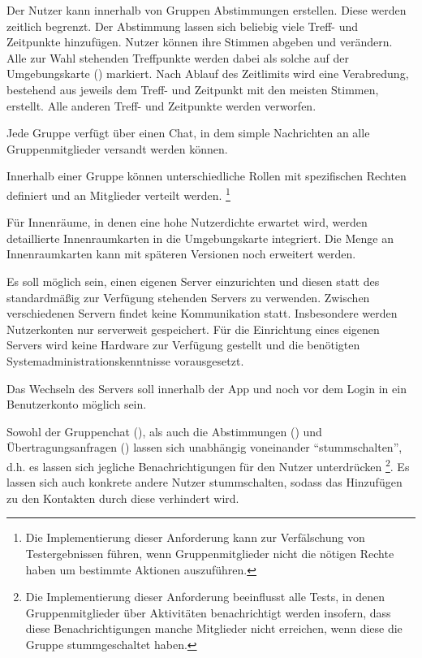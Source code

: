 \documentclass[parskip=full,11pt]{scrartcl}
\begin{document}
%
Der Nutzer kann innerhalb von Gruppen Abstimmungen erstellen.
Diese werden zeitlich begrenzt.
Der Abstimmung lassen sich beliebig viele Treff- und Zeitpunkte hinzufügen.
Nutzer können ihre Stimmen abgeben und verändern.
Alle zur Wahl stehenden Treffpunkte werden dabei als solche auf der
Umgebungskarte () markiert.
Nach Ablauf des Zeitlimits wird eine Verabredung, bestehend aus jeweils dem
Treff- und Zeitpunkt mit den meisten Stimmen, erstellt.
Alle anderen Treff- und Zeitpunkte werden verworfen.

%
Jede Gruppe verfügt über einen Chat, in dem simple Nachrichten an alle
Gruppenmitglieder versandt werden können.

Innerhalb einer Gruppe können unterschiedliche Rollen
mit spezifischen Rechten definiert und an Mitglieder verteilt werden.
\footnote{Die Implementierung dieser Anforderung kann zur Verfälschung von
Testergebnissen führen, wenn Gruppenmitglieder nicht die nötigen Rechte haben
um bestimmte Aktionen auszuführen.}

%
Für Innenräume, in denen eine hohe Nutzerdichte erwartet wird, werden
detaillierte Innenraumkarten in die Umgebungskarte integriert. Die Menge an
Innenraumkarten kann mit späteren Versionen noch erweitert werden.

%
Es soll möglich sein, einen eigenen Server einzurichten und diesen statt des
standardmäßig zur Verfügung stehenden Servers zu verwenden.
Zwischen verschiedenen Servern findet keine Kommunikation statt.
Insbesondere werden Nutzerkonten nur serverweit gespeichert.
Für die Einrichtung eines eigenen Servers wird keine Hardware zur Verfügung
gestellt und die benötigten Systemadministrationskenntnisse vorausgesetzt.

%
Das Wechseln des Servers soll innerhalb der App und noch vor dem Login in ein
Benutzerkonto möglich sein.

%
Sowohl der Gruppenchat (), als auch die
Abstimmungen () und Übertragungsanfragen
() lassen sich unabhängig voneinander
\enquote{stummschalten}, d.h. es lassen sich jegliche Benachrichtigungen für den
Nutzer unterdrücken%
\footnote{Die Implementierung dieser Anforderung beeinflusst alle Tests, in denen
	Gruppenmitglieder über Aktivitäten benachrichtigt werden insofern, dass diese Benachrichtigungen
manche Mitglieder nicht erreichen, wenn diese die Gruppe stummgeschaltet haben.}.
Es lassen sich auch konkrete andere Nutzer stummschalten, sodass das
Hinzufügen zu den Kontakten durch diese verhindert wird.
\end{document}
